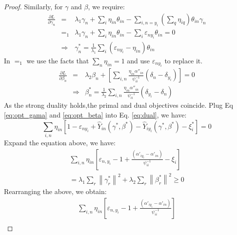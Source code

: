 \begin{proof}
Similarly, for $\gamma$ and $\beta$, we require:
\begin{eqnarray}\label{eq:opt_gama}
\frac{{\partial L}}{{\partial {\gamma _n}}} &=& {\lambda _1}{\gamma _n} + \sum\limits_i {{\eta _{in}}{\theta _{in}}}  - \sum\limits_{i,n = {y_i}} {\left( {\sum\limits_q {{\eta _{iq}}} } \right){\theta _{in}}{\gamma _n}}  \nonumber\\
&=_1 &{\lambda _1}{\gamma _n} + \sum\limits_i {{\eta _{in}}{\theta _{in}}}  - \sum\limits_i {{\varepsilon _{n{y_i}}}{\theta _{in}}}  = 0  \nonumber\\
&\Rightarrow & \gamma _n^* = \frac{1}{{{\lambda _1}}}\sum\limits_i {\left( {{\varepsilon _{n{y_i}}} - {\eta _{in}}} \right){\theta _{in}}} 
\end{eqnarray}
In $=_1$ we use the facts that $\sum_n\eta_{in}=1$ and use $\varepsilon_{ny_i}$ to replace it.
\begin{eqnarray}\label{eq:opt_beta}
\frac{{\partial L}}{{\partial {\beta _n}}} &=& {\lambda _2}{\beta _n} + \left[ {\sum\limits_{i,n} {\frac{{{\eta _{in}}{{\alpha ''}_{in}}}}{{\psi_{ii}^{ - 1}}}\left( {{\delta _n} - {\delta _{{y_i}}}} \right)} } \right] = 0 \nonumber \\
&\Rightarrow &\beta _n^* = \frac{1}{{{\lambda _2}}}\sum\limits_{i,n} {\frac{{{\eta _{in}}{{\alpha ''}_{in}}}}{{\psi _{ii}^{ - 1}}}\left( {{\delta _{{y_i}}} - {\delta _n}} \right)} 
\end{eqnarray}
As the strong duality holds,the primal and dual objectives coincide. Plug Eq \eqref{eq:opt_gama} and \eqref{eq:opt_beta} into Eq. \eqref{eq:dual}, we have:
\begin{equation*}
\sum\limits_{i,n} {{\eta _{in}}\left[ {1 - {\varepsilon _{n{y_i}}} + {{\hat Y}_{in}}\left( {\gamma^* ,\beta^* } \right) - {{\hat Y}_{i{y_i}}}\left( {\gamma^* ,\beta^* } \right) - {\xi _i^*}} \right]}=0
\end{equation*}
Expand the equation above, we have:
\begin{eqnarray}\nonumber
\sum\limits_{i,n} {{\eta _{in}}\left[ { {\varepsilon _{n,{y_i}}}-1 + \frac{{\left( {{{\alpha '}_{i{y_i}}} - {{\alpha '}_{in}}} \right)}}{{\psi_{ii}^{ - 1}}} - {\xi _i}} \right]} \nonumber\\ 
= {\lambda _1}\sum\limits_r {{{\left\| {\gamma _r^*} \right\|}^2}}  + {\lambda _2}\sum\limits_r {{{\left\| {\beta _r^*} \right\|}^2}}  \ge 0\nonumber
\end{eqnarray}
Rearranging the above, we obtain:
\begin{eqnarray}\label{eq:link1}
\sum\limits_{i,n} {{\eta _{in}}\left[ { {\varepsilon _{n,{y_i}}} -1+ \frac{{\left( {{{\alpha '}_{i{y_i}}} - {{\alpha '}_{in}}} \right)}}{{\psi_{ii}^{ - 1}}}} \right]} \nonumber\\ 

\end{eqnarray}
\end{proof}
